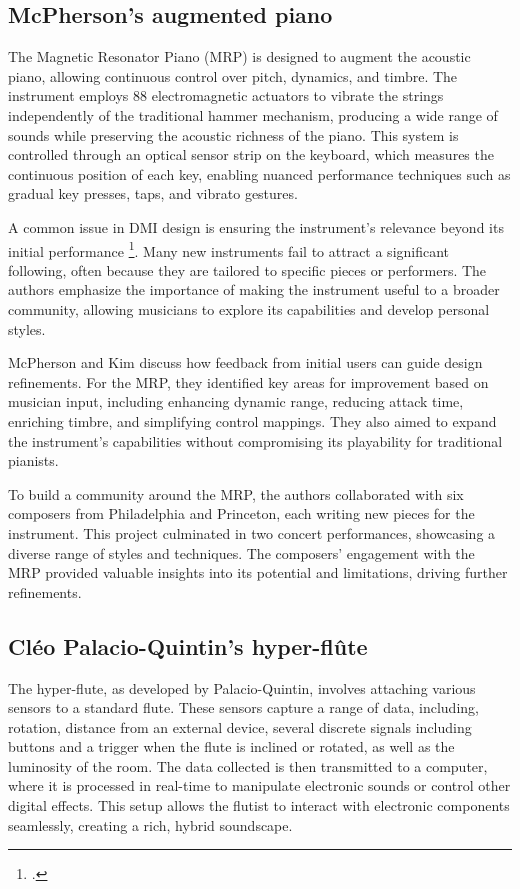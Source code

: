 \documentclass[12pt,twoside,maitrise]{dms_ks}
\theoremstyle{definition}
\begin{document}
{\subsection{McPherson's augmented piano}

The Magnetic Resonator Piano (MRP) is designed to augment the acoustic piano, allowing continuous control over pitch, dynamics, and timbre. 
The instrument employs 88 electromagnetic actuators to vibrate the strings independently of the traditional hammer mechanism, producing a wide range of sounds while preserving the acoustic richness of the piano. 
This system is controlled through an optical sensor strip on the keyboard, which measures the continuous position of each key, enabling nuanced performance techniques such as gradual key presses, taps, and vibrato gestures.

A common issue in DMI design is ensuring the instrument's relevance beyond its initial performance \footcite{mcpherson_problem_2012}. 
Many new instruments fail to attract a significant following, often because they are tailored to specific pieces or performers. 
The authors emphasize the importance of making the instrument useful to a broader community, allowing musicians to explore its capabilities and develop personal styles.

McPherson and Kim discuss how feedback from initial users can guide design refinements. 
For the MRP, they identified key areas for improvement based on musician input, including enhancing dynamic range, reducing attack time, enriching timbre, and simplifying control mappings. 
They also aimed to expand the instrument's capabilities without compromising its playability for traditional pianists.

To build a community around the MRP, the authors collaborated with six composers from Philadelphia and Princeton, each writing new pieces for the instrument. 
This project culminated in two concert performances, showcasing a diverse range of styles and techniques. 
The composers' engagement with the MRP provided valuable insights into its potential and limitations, driving further refinements.

\subsection{Cléo Palacio-Quintin's hyper-flûte}

The hyper-flute, as developed by Palacio-Quintin, involves attaching various sensors to a standard flute. 
These sensors capture a range of data, including, rotation, distance from an external device, several discrete signals including buttons and a trigger when the flute is inclined or rotated, as well as the luminosity of the room. 
The data collected is then transmitted to a computer, where it is processed in real-time to manipulate electronic sounds or control other digital effects. 
This setup allows the flutist to interact with electronic components seamlessly, creating a rich, hybrid soundscape.

}
\end{document}
